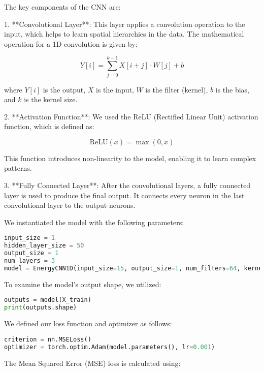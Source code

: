 \documentclass{article}
\begin{document}
The key components of the CNN are:

1. **Convolutional Layer**: This layer applies a convolution operation to the input, which helps to learn spatial hierarchies in the data. The mathematical operation for a 1D convolution is given by:

\begin{center}
\[
Y[i] = \sum_{j=0}^{k-1} X[i+j] \cdot W[j] + b
\]
\end{center}

where \(Y[i]\) is the output, \(X\) is the input, \(W\) is the filter (kernel), \(b\) is the bias, and \(k\) is the kernel size.

2. **Activation Function**: We used the ReLU (Rectified Linear Unit) activation function, which is defined as:

\begin{center}
\[
\text{ReLU}(x) = \max(0, x)
\]
\end{center}

This function introduces non-linearity to the model, enabling it to learn complex patterns.

3. **Fully Connected Layer**: After the convolutional layers, a fully connected layer is used to produce the final output. It connects every neuron in the last convolutional layer to the output neurons.

We instantiated the model with the following parameters:

\begin{lstlisting}[language=Python,]
input_size = 1
hidden_layer_size = 50
output_size = 1
num_layers = 3
model = EnergyCNN1D(input_size=15, output_size=1, num_filters=64, kernel_size=1, num_layers=2)
\end{lstlisting}

To examine the model's output shape, we utilized:

\begin{lstlisting}[language=Python,]
outputs = model(X_train)
print(outputs.shape)
\end{lstlisting}

We defined our loss function and optimizer as follows:

\begin{lstlisting}[language=Python,]
criterion = nn.MSELoss() 
optimizer = torch.optim.Adam(model.parameters(), lr=0.001)
\end{lstlisting}

The Mean Squared Error (MSE) loss is calculated using:
\end{document}

